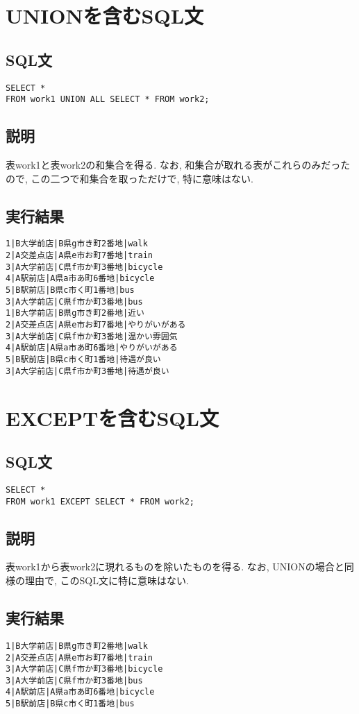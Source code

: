 \documentclass{jarticle}
\begin{document}
\section{UNIONを含むSQL文}
\subsection{SQL文}
\begin{verbatim}
SELECT * 
FROM work1 UNION ALL SELECT * FROM work2;
\end{verbatim}
\subsection{説明}
表work1と表work2の和集合を得る. なお, 和集合が取れる表がこれらのみだったので, この二つで和集合を取っただけで, 特に意味はない.
\subsection{実行結果}
\begin{verbatim}
1|B大学前店|B県g市き町2番地|walk
2|A交差点店|A県e市お町7番地|train
3|A大学前店|C県f市か町3番地|bicycle
4|A駅前店|A県a市あ町6番地|bicycle
5|B駅前店|B県c市く町1番地|bus
3|A大学前店|C県f市か町3番地|bus
1|B大学前店|B県g市き町2番地|近い
2|A交差点店|A県e市お町7番地|やりがいがある
3|A大学前店|C県f市か町3番地|温かい雰囲気
4|A駅前店|A県a市あ町6番地|やりがいがある
5|B駅前店|B県c市く町1番地|待遇が良い
3|A大学前店|C県f市か町3番地|待遇が良い
\end{verbatim}
\section{EXCEPTを含むSQL文}
\subsection{SQL文}
\begin{verbatim}
SELECT * 
FROM work1 EXCEPT SELECT * FROM work2;
\end{verbatim}
\subsection{説明}
表work1から表work2に現れるものを除いたものを得る. なお, UNIONの場合と同様の理由で, このSQL文に特に意味はない.
\subsection{実行結果}
\begin{verbatim}
1|B大学前店|B県g市き町2番地|walk
2|A交差点店|A県e市お町7番地|train
3|A大学前店|C県f市か町3番地|bicycle
3|A大学前店|C県f市か町3番地|bus
4|A駅前店|A県a市あ町6番地|bicycle
5|B駅前店|B県c市く町1番地|bus
\end{verbatim}
\end{document}
